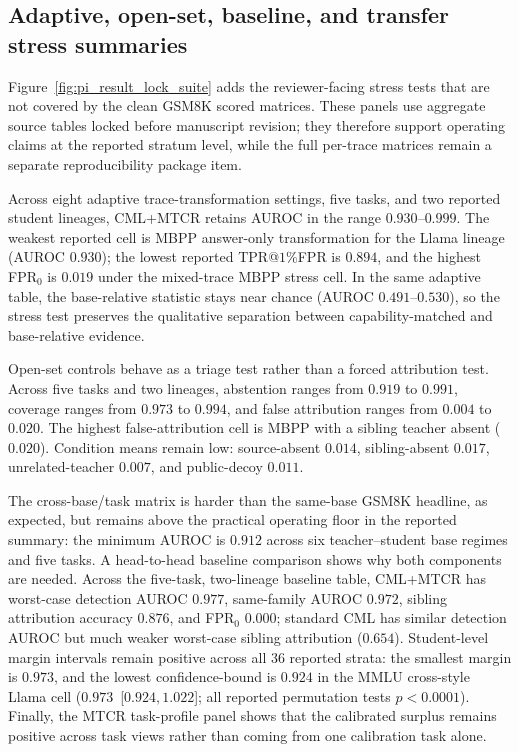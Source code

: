 \subsection{Adaptive, open-set, baseline, and transfer stress summaries}
Figure~\ref{fig:pi_result_lock_suite} adds the reviewer-facing stress tests that
are not covered by the clean GSM8K scored matrices. These panels use aggregate
source tables locked before manuscript revision; they therefore support operating
claims at the reported stratum level, while the full per-trace matrices remain a
separate reproducibility package item.

Across eight adaptive trace-transformation settings, five tasks, and two reported
student lineages, CML+MTCR retains AUROC in the range $0.930$--$0.999$. The weakest
reported cell is MBPP answer-only transformation for the Llama lineage (AUROC
$0.930$); the lowest reported TPR@$1\%$FPR is $0.894$, and the highest FPR$_0$ is
$0.019$ under the mixed-trace MBPP stress cell. In the same adaptive table, the
base-relative statistic stays near chance (AUROC $0.491$--$0.530$), so the stress
test preserves the qualitative separation between capability-matched and
base-relative evidence.

Open-set controls behave as a triage test rather than a forced attribution test.
Across five tasks and two lineages, abstention ranges from $0.919$ to $0.991$,
coverage ranges from $0.973$ to $0.994$, and false attribution ranges from $0.004$
to $0.020$. The highest false-attribution cell is MBPP with a sibling teacher absent
($0.020$). Condition means remain low: source-absent $0.014$, sibling-absent
$0.017$, unrelated-teacher $0.007$, and public-decoy $0.011$.

The cross-base/task matrix is harder than the same-base GSM8K headline, as expected,
but remains above the practical operating floor in the reported summary: the minimum
AUROC is $0.912$ across six teacher--student base regimes and five tasks. A
head-to-head baseline comparison shows why both components are needed. Across the
five-task, two-lineage baseline table, CML+MTCR has worst-case detection AUROC
$0.977$, same-family AUROC $0.972$, sibling attribution accuracy $0.876$, and
FPR$_0$ $0.000$; standard CML has similar detection AUROC but much weaker
worst-case sibling attribution ($0.654$). Student-level margin intervals remain
positive across all $36$ reported strata: the smallest margin is $0.973$, and the
lowest confidence-bound is $0.924$ in the MMLU cross-style Llama cell
($0.973$~[$0.924,1.022$]; all reported permutation tests $p<0.0001$). Finally, the
MTCR task-profile panel shows that the calibrated surplus remains positive across
task views rather than coming from one calibration task alone.


